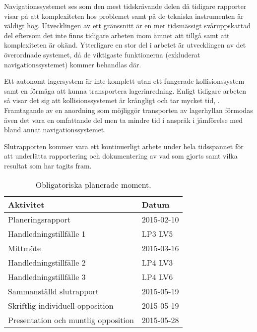 \documentclass[a4paper,11pt]{article}
\begin{document}
Navigationssystemet ses som den mest tidskrävande delen då tidigare
rapporter visar på att komplexiteten hos problemet samt på de tekniska
instrumenten är väldigt hög. Utvecklingen av ett gränssnitt är en mer
tidsmässigt svåruppskattad del eftersom det inte finns tidigare arbeten
inom ämnet att tillgå samt att komplexiteten är okänd. Ytterligare en stor
del i arbetet är utvecklingen av det överordnade systemet, då de viktigaste
funktionerna (exkluderat navigationssystemet) kommer behandlas där. 

Ett autonomt lagersystem är inte komplett utan ett fungerade
kollisionssystem samt en förmåga att kunna transportera lagerinredning.
Enligt tidigare arbeten så visar det sig att kollisionssystemet är
krångligt och tar mycket tid, \cite{laser,qr}. Framtagande av en anordning
som möjliggör transporten av lagerhyllan förmodas även det vara en
omfattande del men ta mindre tid i anspråk i jämförelse med bland annat
navigationssystemet.

Slutrapporten kommer vara ett kontinuerligt arbete under hela tidsspannet
för att underlätta rapportering och dokumentering av vad som gjorts samt
vilka resultat som har tagits fram.



\begin{table}[h]
  \begin{center}
    \begin{tabular}{l | l}
      Aktivitet                           & Datum      \\ \hline
      Planeringsrapport                   & 2015-02-10 \\
      Handledningstillfälle 1             & LP3 LV5    \\
      Mittmöte                            & 2015-03-16 \\
      Handledningstillfälle 2             & LP4 LV3    \\
      Handledningstillfälle 3             & LP4 LV6    \\
      Sammanställd slutrapport            & 2015-05-19 \\
      Skriftlig individuell opposition    & 2015-05-19 \\
      Presentation och muntlig opposition & 2015-05-28 \\
    \end{tabular}
  \end{center}
  \caption{Obligatoriska planerade moment.}
  \label{tab:planeringstabell}
\end{table}
\end{document}
